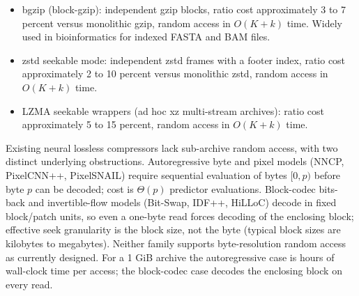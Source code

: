 \documentclass[
]{article}
\begin{document}
\begin{itemize}
\item
  bgzip (block-gzip): independent gzip blocks, ratio cost
  approximately 3 to 7 percent versus monolithic gzip, random access
  in $O(K + k)$ time. Widely used in bioinformatics for indexed FASTA
  and BAM files.
\item
  zstd seekable mode: independent zstd frames with a footer index,
  ratio cost approximately 2 to 10 percent versus monolithic zstd,
  random access in $O(K + k)$ time.
\item
  LZMA seekable wrappers (ad hoc xz multi-stream archives): ratio
  cost approximately 5 to 15 percent, random access in $O(K + k)$
  time.
\end{itemize}

Existing neural lossless compressors lack sub-archive random access,
with two distinct underlying obstructions. Autoregressive byte and
pixel models (NNCP, PixelCNN++, PixelSNAIL) require sequential
evaluation of bytes $[0, p)$ before byte $p$ can be decoded; cost is
$\Theta(p)$ predictor evaluations. Block-codec bits-back and
invertible-flow models (Bit-Swap, IDF++, HiLLoC) decode in fixed
block/patch units, so even a one-byte read forces decoding of the
enclosing block; effective seek granularity is the block size, not
the byte (typical block sizes are kilobytes to megabytes). Neither
family supports byte-resolution random access as currently designed.
For a 1 GiB archive the autoregressive case is hours of wall-clock
time per access; the block-codec case decodes the enclosing block
on every read.
\end{document}

